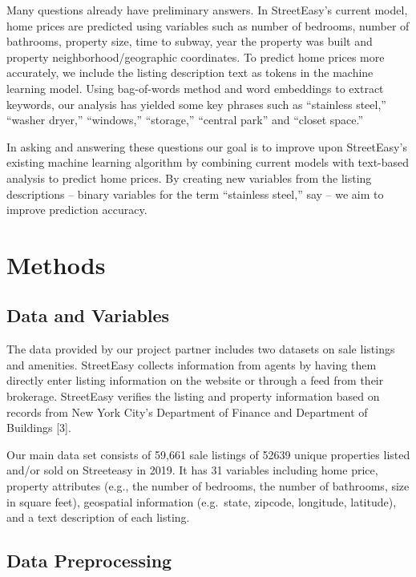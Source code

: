 \documentclass[10pt,letterpaper]{article}
\begin{document}
Many questions already have preliminary answers. In StreetEasy's current
model, home prices are predicted using variables such as number of
bedrooms, number of bathrooms, property size, time to subway, year the
property was built and property neighborhood/geographic coordinates. To
predict home prices more accurately, we include the listing description
text as tokens in the machine learning model. Using bag-of-words method
and word embeddings to extract keywords, our analysis has yielded some
key phrases such as ``stainless steel,'' ``washer dryer,'' ``windows,''
``storage,'' ``central park'' and ``closet space.''

In asking and answering these questions our goal is to improve upon
StreetEasy's existing machine learning algorithm by combining current
models with text-based analysis to predict home prices. By creating new
variables from the listing descriptions -- binary variables for the term
``stainless steel,'' say -- we aim to improve prediction accuracy.

\hypertarget{methods}{%
\section{Methods}\label{methods}}

\hypertarget{data-and-variables}{%
\subsection{Data and Variables}\label{data-and-variables}}

The data provided by our project partner includes two datasets on sale
listings and amenities. StreetEasy collects information from agents by
having them directly enter listing information on the website or through
a feed from their brokerage. StreetEasy verifies the listing and
property information based on records from New York City's Department of
Finance and Department of Buildings {[}3{]}.

Our main data set consists of 59,661 sale listings of 52639 unique
properties listed and/or sold on Streeteasy in 2019. It has 31 variables
including home price, property attributes (e.g., the number of bedrooms,
the number of bathrooms, size in square feet), geospatial information
(e.g.~state, zipcode, longitude, latitude), and a text description of
each listing.

\hypertarget{data-preprocessing}{%
\subsection{Data Preprocessing}\label{data-preprocessing}}
\end{document}
